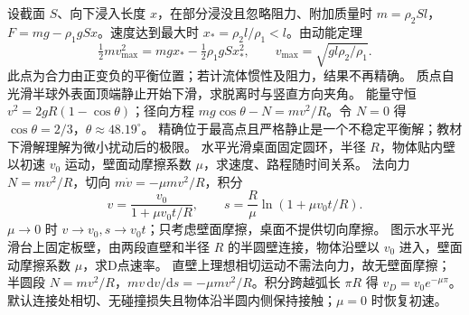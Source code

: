 \workings 设截面 $S$、向下浸入长度 $x$，在部分浸没且忽略阻力、附加质量时 $m=\rho_2Sl$，$F=mg-\rho_1gSx$。速度达到最大时 $x_*=\rho_2l/\rho_1<l$。由动能定理
\[
\tfrac12 mv_{\max}^2=mgx_*-\tfrac12\rho_1gSx_*^2,\qquad
v_{\max}=\sqrt{g l\rho_2/\rho_1}.
\]
\crosscheck 此点为合力由正变负的平衡位置；若计流体惯性及阻力，结果不再精确。
\problemtext 质点自光滑半球外表面顶端静止开始下滑，求脱离时与竖直方向夹角。
\workings 能量守恒 $v^2=2gR(1-\cos\theta)$；径向方程 $mg\cos\theta-N=mv^2/R$。令 $N=0$ 得 $\cos\theta=2/3$，$\theta\approx48.19^\circ$。
\crosscheck 精确位于最高点且严格静止是一个不稳定平衡解；教材下滑解理解为微小扰动后的极限。
\problemtext 水平光滑桌面固定圆环，半径 $R$，物体贴内壁以初速 $v_0$ 运动，壁面动摩擦系数 $\mu$，求速度、路程随时间关系。
\workings 法向力 $N=mv^2/R$，切向 $m\dot v=-\mu mv^2/R$，积分
\[
v=\frac{v_0}{1+\mu v_0t/R},\qquad
s=\frac R\mu\ln(1+\mu v_0t/R).
\]
\crosscheck $\mu\to0$ 时 $v\to v_0,s\to v_0t$；只考虑壁面摩擦，桌面不提供切向摩擦。
\problemtext 图示水平光滑台上固定板壁，由两段直壁和半径 $R$ 的半圆壁连接，物体沿壁以 $v_0$ 进入，壁面动摩擦系数 $\mu$，求D点速率。
\workings 直壁上理想相切运动不需法向力，故无壁面摩擦；半圆段 $N=mv^2/R$，$m v\,\mathrm dv/\mathrm ds=-\mu mv^2/R$。积分跨越弧长 $\pi R$ 得 $v_D=v_0e^{-\mu\pi}$。
\crosscheck 默认连接处相切、无碰撞损失且物体沿半圆内侧保持接触；$\mu=0$ 时恢复初速。

